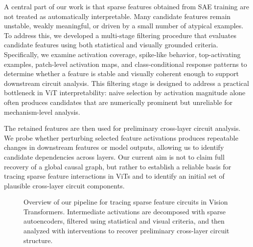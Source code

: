 \documentclass[10pt]{article}
\begin{document}
A central part of our work is that sparse features obtained from SAE training are not treated as automatically interpretable. Many candidate features remain unstable, weakly meaningful, or driven by a small number of atypical examples. To address this, we developed a multi-stage filtering procedure that evaluates candidate features using both statistical and visually grounded criteria. Specifically, we examine activation coverage, spike-like behavior, top-activating examples, patch-level activation maps, and class-conditional response patterns to determine whether a feature is stable and visually coherent enough to support downstream circuit analysis. This filtering stage is designed to address a practical bottleneck in ViT interpretability: naive selection by activation magnitude alone often produces candidates that are numerically prominent but unreliable for mechanism-level analysis.

The retained features are then used for preliminary cross-layer circuit analysis. We probe whether perturbing selected feature activations produces repeatable changes in downstream features or model outputs, allowing us to identify candidate dependencies across layers. Our current aim is not to claim full recovery of a global causal graph, but rather to establish a reliable basis for tracing sparse feature interactions in ViTs and to identify an initial set of plausible cross-layer circuit components.

\begin{figure}[H]
    \centering
    \caption{
    Overview of our pipeline for tracing sparse feature circuits in Vision Transformers. Intermediate activations are decomposed with sparse autoencoders, filtered using statistical and visual criteria, and then analyzed with interventions to recover preliminary cross-layer circuit structure.
    }
    \label{fig:pipeline}
\end{figure}
\end{document}
